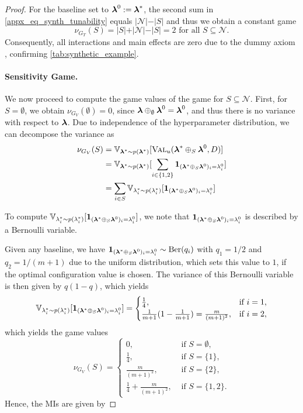\documentclass[letterpaper]{article} %
\begin{document}
\begin{proof}
For the baseline set to $\boldsymbol{\lambda}^0 := \boldsymbol{\lambda}^\ast$, the second sum in \cref{appx_eq_synth_tunability} equals  $\vert \mathcal N \vert - \vert S \vert$ and thus we obtain a constant game
\[
    \nu_{G_T}(S) = \vert S \vert + \vert \mathcal N \vert - \vert S \vert = 2 \text{ for all } S\subseteq \mathcal N.
\]
Consequently, all interactions and main effects are zero due to the dummy axiom \citep{Fujimoto.2006}, confirming \cref{tab:synthetic_example}.


\paragraph{Sensitivity Game.}
We now proceed to compute the game values of the \sensitivity game for $S \subseteq \mathcal N$.
First, for $S=\emptyset$, we obtain $\nu_{G_V}(\emptyset)=0$, since $\boldsymbol{\lambda} \oplus_{\emptyset} \boldsymbol{\lambda}^0 = \boldsymbol{\lambda}^0$, and thus there is no variance with respect to $\boldsymbol{\lambda}$.
Due to independence of the hyperparameter distribution, we can decompose the variance as
\begin{align*}\label{appx_eq_synth_sens}
    \nu_{G_V}(S) &=  \mathbb{V}_{\boldsymbol{\lambda}^\ast \sim p(\boldsymbol{\lambda}^\ast)}[\textsc{Val}_u(\boldsymbol{\lambda}^\ast \oplus_S \boldsymbol{\lambda}^0, D)]\\
    &=  \mathbb{V}_{\boldsymbol{\lambda}^\ast \sim p(\boldsymbol{\lambda}^\ast)}[\sum_{i \in \{1,2\}} \mathbf{1}_{(\boldsymbol{\lambda}^\ast \oplus_S \boldsymbol{\lambda}^0)_i = \lambda^0_i}] \\
    &= \sum_{i \in S} \mathbb{V}_{\lambda_i^\ast \sim p(\lambda_i^\ast)}[\mathbf{1}_{(\boldsymbol{\lambda}^\ast \oplus_S \boldsymbol{\lambda}^0)_i = \lambda^0_i}]
\end{align*}

To compute $\mathbb{V}_{\lambda_i^\ast \sim p(\lambda_i^\ast)}[\mathbf{1}_{(\boldsymbol{\lambda}^\ast \oplus_S \boldsymbol{\lambda}^0)_i = \lambda^0_i}]$, we note that $\mathbf{1}_{(\boldsymbol{\lambda}^\ast \oplus_S \boldsymbol{\lambda}^0)_i = \lambda^0_i}$ is described by a Bernoulli variable.

Given any baseline, we have $\mathbf{1}_{(\boldsymbol{\lambda}^\ast \oplus_S \boldsymbol{\lambda}^0)_i = \lambda^0_i} \sim \text{Ber}(q_i)$ with $q_1 = 1/2$ and $q_2 = 1/(m+1)$ due to the uniform distribution, which sets this value to $1$, if the optimal configuration value is chosen.
The variance of this Bernoulli variable is then given by $q(1-q)$, which yields 
\[
    \mathbb{V}_{\lambda_i^\ast \sim p(\lambda_i^\ast)}[\mathbf{1}_{(\boldsymbol{\lambda}^\ast \oplus_S \boldsymbol{\lambda}^0)_i = \lambda^0_i}] = \begin{cases}
        \frac{1}{4}, &\text{if } i=1, \\
        \frac{1}{m+1}(1-\frac{1}{m+1}) =  \frac{m}{(m+1)^2}, &\text{if } i=2,
    \end{cases}
\]
which yields the game values 
\[
 \nu_{G_V}(S) = 
        \begin{cases}
        0, &\text{ if } S = \emptyset, \\
        \frac{1}{4}, &\text{ if } S = \{1\}, \\
        \frac{m}{(m+1)^2}, &\text{ if } S = \{2\}, \\
         \frac{1}{4} + \frac{m}{(m+1)^2}, &\text{ if } S=\{1,2\}.
        \end{cases}
\]
Hence, the \glspl*{MI} are given by


\end{proof}
\end{document}
